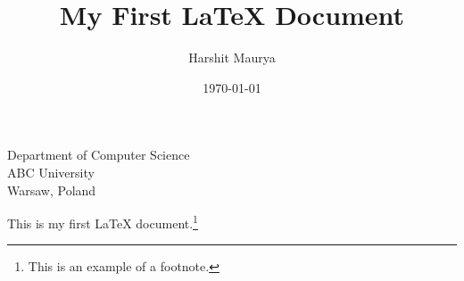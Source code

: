 \documentclass[12pt,a4paper]{article}
\begin{document}
\title{My First LaTeX Document}
\author{Harshit Maurya}
\date{\today}

\maketitle

\begin{center}
Department of Computer Science\\
ABC University\\
Warsaw, Poland
\end{center}

This is my first LaTeX document.\footnote{This is an example of a footnote.}
\end{document}
